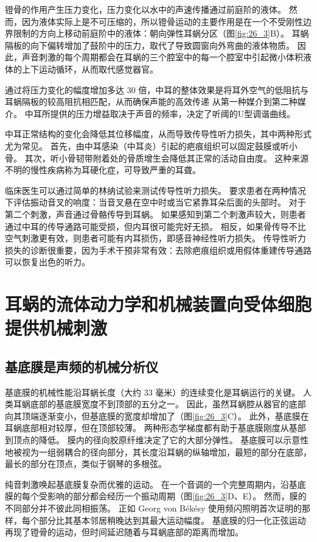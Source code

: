 镫骨的作用产生压力变化，压力变化以水中的声速传播通过前庭阶的液体。 
然而，因为液体实际上是不可压缩的，所以镫骨运动的主要作用是在一个不受刚性边界限制的方向上移动前庭阶中的液体：朝向弹性耳蜗分区（图\ref{fig:26_3}B）。 
耳蜗隔板的向下偏转增加了鼓阶中的压力，取代了导致圆窗向外弯曲的液体物质。 
因此，声音刺激的每个周期都会在耳蜗的三个腔室中的每一个腔室中引起微小体积液体的上下运动循环，从而取代感觉器官。


通过将压力变化的幅度增加多达 30 倍，中耳的整体效果是将耳外空气的低阻抗与耳蜗隔板的较高阻抗相匹配，从而确保声能的高效传递 从第一种媒介到第二种媒介。 
中耳所提供的压力增益取决于声音的频率，决定了听阈的U型调谐曲线。


中耳正常结构的变化会降低其位移幅度，从而导致传导性听力损失，其中两种形式尤为常见。 
首先，由中耳感染（中耳炎）引起的疤痕组织可以固定鼓膜或听小骨。 
其次，听小骨韧带附着处的骨质增生会降低其正常的活动自由度。 
这种来源不明的慢性疾病称为耳硬化症，可导致严重的耳聋。


临床医生可以通过简单的林纳试验来测试传导性听力损失。 
要求患者在两种情况下评估振动音叉的响度：当音叉悬在空中时或当它紧靠耳朵后面的头部时。 
对于第二个刺激，声音通过骨骼传导到耳蜗。 
如果感知到第二个刺激声较大，则患者通过中耳的传导通路可能受损，但内耳很可能完好无损。 
相反，如果骨传导不比空气刺激更有效，则患者可能有内耳损伤，即感音神经性听力损失。 
传导性听力损失的诊断很重要，因为手术干预非常有效：去除疤痕组织或用假体重建传导通路可以恢复出色的听力。


\section{耳蜗的流体动力学和机械装置向受体细胞提供机械刺激}

\subsection{基底膜是声频的机械分析仪}
基底膜的机械性能沿耳蜗长度（大约 33 毫米）的连续变化是耳蜗运行的关键。 
人类耳蜗底部的基底膜宽度不到顶部的五分之一。 
因此，虽然耳蜗腔从器官的底部向其顶端逐渐变小，但基底膜的宽度却增加了（图\ref{fig:26_3}C）。 
此外，基底膜在耳蜗底部相对较厚，但在顶部较薄。 
两种形态学梯度都有助于基底膜刚度从基部到顶点的降低。 
膜内的径向胶原纤维决定了它的大部分弹性。 
基底膜可以示意性地被视为一组弱耦合的径向部分，其长度沿耳蜗的纵轴增加，最短的部分在底部，最长的部分在顶点，类似于钢琴的多根弦。


纯音刺激唤起基底膜复杂而优雅的运动。 
在一个音调的一个完整周期内，沿基底膜的每个受影响的部分都会经历一个振动周期（图\ref{fig:26_3}D、E）。
然而，膜的不同部分并不彼此同相振荡。 
正如 Georg von Békésy 使用频闪照明首次证明的那样，每个部分比其基本邻居稍晚达到其最大运动幅度。 
基底膜的归一化正弦运动再现了镫骨的运动，但时间延迟随着与耳蜗底部的距离而增加。

